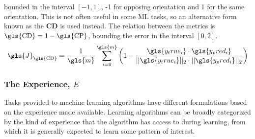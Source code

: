 \begin{itemize}
    bounded in the interval $[-1,1]$, -1 for opposing orientation and 1 for the
    same orientation. This is not often useful in some \gls{ML} tasks, so an
    alternative form known as the \textbf{\gls{CD}} is used instead. The
    relation between the metrics is $\text{\gls{CD}}=1-\text{\gls{CP}}$,
    bounding the error in the interval $[0,2]$.
    \begin{equation}
        \gls{J}_\text{\gls{CD}} =
        \frac{1}{\gls{m}}\sum_{i=0}^{\gls{m}}\bigg(1-\frac{\gls{y_true_i}\cdot{}\gls{y_pred_i}}{||\gls{y_true_i}||_2\cdot{}||\gls{y_pred_i}||_2}\bigg)
    \end{equation}
\end{itemize}

%
%
%
%


\subsubsection{The Experience, $E$\label{sec:ML-experience}}
Tasks provided to machine learning algorithms have different formulations based
on the experience made available. Learning algorithms can be broadly categorized
by the kind of experience that the algorithm has access to during learning, from
which it is generally expected to learn some pattern of interest.

